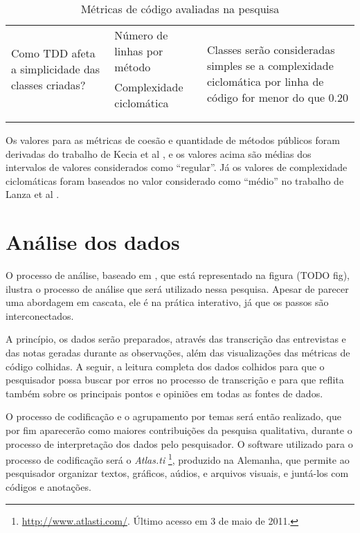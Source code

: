 \begin{table}[h!]
\begin{tabular}{ | p{5cm} | p{5cm} | p{5cm} | }
		\multirow{2}{5cm}{Como TDD afeta a simplicidade das classes criadas?}
		& Número de linhas por método & 
		\multirow{4}{5cm}{Classes serão consideradas simples se a complexidade
		ciclomática por linha de código for menor do que 0.20 } \\
		& Complexidade ciclomática & \\
		& & \\ & & \\
		
		\hline
	\end{tabular}
	\caption{Métricas de código avaliadas na pesquisa}
	\label{tab:metricas}
\end{table}

Os valores para as métricas de coesão e quantidade de métodos públicos foram
derivadas do trabalho de Kecia et al \cite{kecia}, e os valores acima são médias
dos intervalos de valores considerados como ``regular''. Já os valores de
complexidade ciclomáticas foram baseados no valor considerado como ``médio'' no
trabalho de Lanza et al \cite{lanza}.

\section{Análise dos dados}
\label{sec:planejamento-analise}

O processo de análise, baseado em \cite{creswell}, que está representado na
figura (TODO fig), ilustra o processo de análise que será utilizado nessa
pesquisa. Apesar de parecer uma abordagem em cascata, ele é na prática 
interativo, já que os passos são interconectados. 

A princípio, os dados serão preparados, através das transcrição das
entrevistas e das notas geradas durante as observações, além das
visualizações das métricas de código colhidas. A seguir, a leitura completa dos
dados colhidos para que o pesquisador possa buscar por erros no processo de
transcrição e para que reflita também sobre os principais pontos e opiniões em
todas as fontes de dados.

O processo de codificação e o agrupamento
por temas será então realizado, que por fim aparecerão como maiores
contribuições da pesquisa qualitativa, durante o processo de interpretação dos
dados pelo pesquisador. O software utilizado para o processo de codificação será
o \textit{Atlas.ti} \footnote{\url{http://www.atlasti.com/}. Último acesso em 3
de maio de 2011.}, produzido na Alemanha, que permite ao pesquisador organizar textos,
gráficos, aúdios, e arquivos visuais, e juntá-los com códigos e anotações. 

